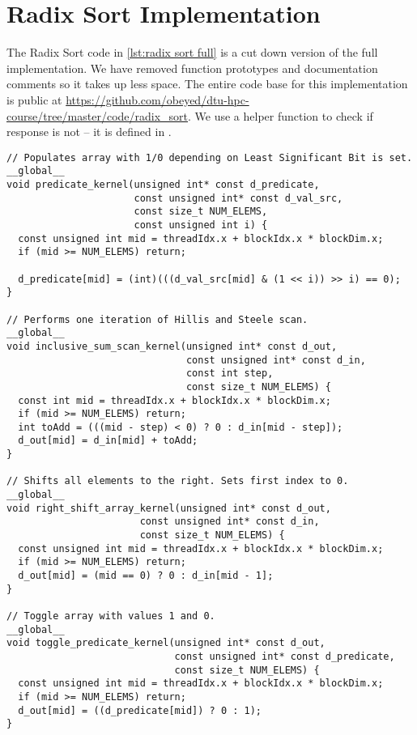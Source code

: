 \chapter{Radix Sort Implementation}
\label{ap:radix sort}

The Radix Sort code in \cref{lst:radix sort full} is a cut down version of the full implementation.
We have removed function prototypes and documentation comments so it takes up less space.
The entire code base for this implementation is public at \href{https://github.com/obeyed/dtu-hpc-course/tree/master/code/radix\_sort}{https://github.com/obeyed/dtu-hpc-course/tree/master/code/radix\_sort}.
We use a helper function  to check if response is not  -- it is defined in .

\begin{lstlisting}[captionpos=t, xleftmargin=0.0pt, xrightmargin=0.0pt, caption={Radix Sort implementation}, label={lst:radix sort full}]
// Populates array with 1/0 depending on Least Significant Bit is set.
__global__
void predicate_kernel(unsigned int* const d_predicate,
                      const unsigned int* const d_val_src,
                      const size_t NUM_ELEMS,
                      const unsigned int i) {
  const unsigned int mid = threadIdx.x + blockIdx.x * blockDim.x;
  if (mid >= NUM_ELEMS) return;

  d_predicate[mid] = (int)(((d_val_src[mid] & (1 << i)) >> i) == 0);
}

// Performs one iteration of Hillis and Steele scan.
__global__
void inclusive_sum_scan_kernel(unsigned int* const d_out,
                               const unsigned int* const d_in,
                               const int step,
                               const size_t NUM_ELEMS) {
  const int mid = threadIdx.x + blockIdx.x * blockDim.x;
  if (mid >= NUM_ELEMS) return;
  int toAdd = (((mid - step) < 0) ? 0 : d_in[mid - step]);
  d_out[mid] = d_in[mid] + toAdd;
}

// Shifts all elements to the right. Sets first index to 0.
__global__
void right_shift_array_kernel(unsigned int* const d_out,
                       const unsigned int* const d_in,
                       const size_t NUM_ELEMS) {
  const unsigned int mid = threadIdx.x + blockIdx.x * blockDim.x;
  if (mid >= NUM_ELEMS) return;
  d_out[mid] = (mid == 0) ? 0 : d_in[mid - 1];
}

// Toggle array with values 1 and 0.
__global__
void toggle_predicate_kernel(unsigned int* const d_out, 
                             const unsigned int* const d_predicate,
                             const size_t NUM_ELEMS) {
  const unsigned int mid = threadIdx.x + blockIdx.x * blockDim.x;
  if (mid >= NUM_ELEMS) return;
  d_out[mid] = ((d_predicate[mid]) ? 0 : 1);
}


\end{lstlisting}
